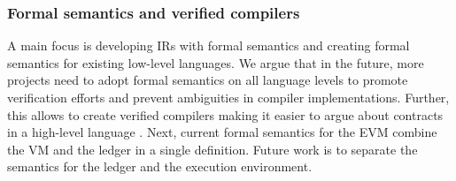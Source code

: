 %
%

\subsubsection{Formal semantics and verified compilers}
A main focus is developing IRs with formal semantics and creating formal semantics for existing low-level languages. We argue that in the future, more projects need to adopt formal semantics on all language levels to promote verification efforts and prevent ambiguities in compiler implementations. Further, this allows to create verified compilers making it easier to argue about contracts in a high-level language \cite{Hirai2017}. 
Next, current formal semantics for the EVM combine the VM and the ledger in a single definition. Future work is to separate the semantics for the ledger and the execution environment. 

